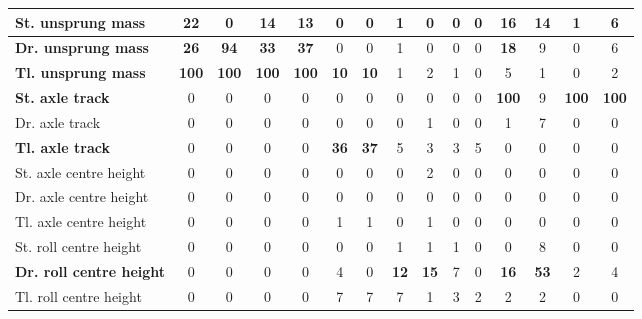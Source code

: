 \begin{table}[H]
\begin{tabular}{|l|c|c|c|c|c|c|c|c|c|c|c|c|c|c|}
    \hline
    \textbf{St. unsprung mass} & \textbf{22} & 0 & \textbf{14} & \textbf{13} & 0 & 0 & 1 & 0 & 0 & 0 & \textbf{16} & \textbf{14} & 1 & 6 \\
    \hline
    \textcolor[rgb]{0.000, 0.447, 0.698}{\textbf{Dr. unsprung mass}} & \textcolor[rgb]{0.000, 0.620, 0.451}{\textbf{26}} & \textcolor[rgb]{0.000, 0.447, 0.698}{\textbf{94}} & \textcolor[rgb]{0.000, 0.620, 0.451}{\textbf{33}} & \textcolor[rgb]{0.000, 0.620, 0.451}{\textbf{37}} & 0 & 0 & 1 & 0 & 0 & 0 & \textbf{18} & 9 & 0 & 6 \\
    \hline
    \textcolor[rgb]{0.851, 0.373, 0.008}{\textbf{Tl. unsprung mass}} & \textcolor[rgb]{0.835, 0.369, 0.000}{\textbf{100}} & \textcolor[rgb]{0.835, 0.369, 0.000}{\textbf{100}} & \textcolor[rgb]{0.835, 0.369, 0.000}{\textbf{100}} & \textcolor[rgb]{0.835, 0.369, 0.000}{\textbf{100}} & \textbf{10} & \textbf{10} & 1 & 2 & 1 & 0 & 5 & 1 & 0 & 2 \\
    \hline
    \textcolor[rgb]{0.851, 0.373, 0.008}{\textbf{St. axle track}} & 0 & 0 & 0 & 0 & 0 & 0 & 0 & 0 & 0 & 0 & \textcolor[rgb]{0.835, 0.369, 0.000}{\textbf{100}} & 9 & \textcolor[rgb]{0.835, 0.369, 0.000}{\textbf{100}} & \textcolor[rgb]{0.835, 0.369, 0.000}{\textbf{100}} \\
    \hline
    Dr. axle track & 0 & 0 & 0 & 0 & 0 & 0 & 0 & 1 & 0 & 0 & 1 & 7 & 0 & 0 \\
    \hline
    \textcolor[rgb]{0.000, 0.620, 0.451}{\textbf{Tl. axle track}} & 0 & 0 & 0 & 0 & \textcolor[rgb]{0.000, 0.620, 0.451}{\textbf{36}} & \textcolor[rgb]{0.000, 0.620, 0.451}{\textbf{37}} & 5 & 3 & 3 & 5 & 0 & 0 & 0 & 0 \\
    \hline
    St. axle centre height & 0 & 0 & 0 & 0 & 0 & 0 & 0 & 2 & 0 & 0 & 0 & 0 & 0 & 0 \\
    \hline
    Dr. axle centre height & 0 & 0 & 0 & 0 & 0 & 0 & 0 & 0 & 0 & 0 & 0 & 0 & 0 & 0 \\
    \hline
    Tl. axle centre height & 0 & 0 & 0 & 0 & 1 & 1 & 0 & 1 & 0 & 0 & 0 & 0 & 0 & 0 \\
    \hline
    St. roll centre height & 0 & 0 & 0 & 0 & 0 & 0 & 1 & 1 & 1 & 0 & 0 & 8 & 0 & 0 \\
    \hline
    \textcolor[rgb]{0.000, 0.447, 0.698}{\textbf{Dr. roll centre height}} & 0 & 0 & 0 & 0 & 4 & 0 & \textbf{12} & \textbf{15} & 7 & 0 & \textbf{16} & \textcolor[rgb]{0.000, 0.447, 0.698}{\textbf{53}} & 2 & 4 \\
    \hline
    Tl. roll centre height & 0 & 0 & 0 & 0 & 7 & 7 & 7 & 1 & 3 & 2 & 2 & 2 & 0 & 0 \\

\end{tabular}
\end{table}
